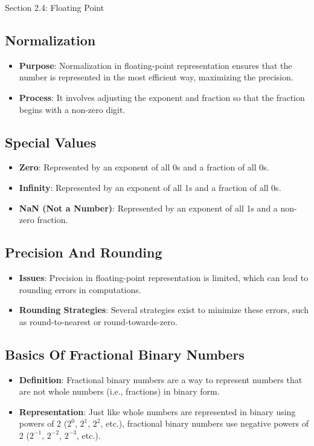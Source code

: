 \begin{notes}{Section 2.4: Floating Point}
    \subsection*{Normalization}

    \begin{itemize}
        \item \textbf{Purpose}: Normalization in floating-point representation ensures that the number is represented in the most efficient way, maximizing the precision.
        \item \textbf{Process}: It involves adjusting the exponent and fraction so that the fraction begins with a non-zero digit.
    \end{itemize}

    \subsection*{Special Values}

    \begin{itemize}
        \item \textbf{Zero}: Represented by an exponent of all 0s and a fraction of all 0s.
        \item \textbf{Infinity}: Represented by an exponent of all 1s and a fraction of all 0s.
        \item \textbf{NaN (Not a Number)}: Represented by an exponent of all 1s and a non-zero fraction.
    \end{itemize}

    \subsection*{Precision And Rounding}

    \begin{itemize}
        \item \textbf{Issues}: Precision in floating-point representation is limited, which can lead to rounding errors in computations.
        \item \textbf{Rounding Strategies}: Several strategies exist to minimize these errors, such as round-to-nearest or round-towards-zero.
    \end{itemize}

    \subsection*{Basics Of Fractional Binary Numbers}

    \begin{itemize}
        \item \textbf{Definition}: Fractional binary numbers are a way to represent numbers that are not whole numbers (i.e., fractions) in binary form.
        \item \textbf{Representation}: Just like whole numbers are represented in binary using powers of 2 ($2^0$, $2^1$, $2^2$, etc.), fractional binary numbers use negative powers of 2 ($2^{-1}$, $2^{-2}$, $2^{-3}$, etc.).
    \end{itemize}


\end{notes}
